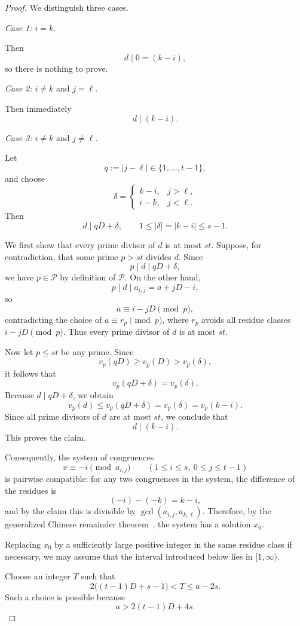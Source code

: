 \documentclass[11pt,letterpaper,reqno]{amsart}
\theoremstyle{definition}
\numberwithin{equation}{section}
\begin{document}
\begin{proof}
We distinguish three cases.

\medskip

\noindent
\emph{Case 1:} $i=k$.

Then
\[
d\mid 0=(k-i),
\]
so there is nothing to prove.

\medskip

\noindent
\emph{Case 2:} $i\ne k$ and $j=\ell$.

Then immediately
\[
d\mid (k-i).
\]

\medskip

\noindent
\emph{Case 3:} $i\ne k$ and $j\ne \ell$.

Let
\[
q:=|j-\ell|\in\{1,\dots,t-1\},
\]
and choose
\[
\delta=
\begin{cases}
k-i,& j>\ell,\\
i-k,& j<\ell.
\end{cases}
\]
Then
\[
d\mid qD+\delta,
\qquad
1\le |\delta|=|k-i|\le s-1.
\]

We first show that every prime divisor of $d$ is at most $st$. Suppose, for contradiction, that some prime $p>st$ divides $d$. Since
\[
p\mid d\mid qD+\delta,
\]
we have $p\in\mathcal P$ by definition of $\mathcal P$. On the other hand,
\[
p\mid d\mid a_{i,j}=a+jD-i,
\]
so
\[
a\equiv i-jD \pmod p,
\]
contradicting the choice of $a\equiv r_p\pmod p$, where $r_p$ avoids all residue classes $i-jD\pmod p$. Thus every prime divisor of $d$ is at most $st$.

Now let $p\le st$ be any prime. Since
\[
v_p(qD)\ge v_p(D)>v_p(\delta),
\]
it follows that
\[
v_p(qD+\delta)=v_p(\delta).
\]
Because $d\mid qD+\delta$, we obtain
\[
v_p(d)\le v_p(qD+\delta)=v_p(\delta)=v_p(k-i).
\]
Since all prime divisors of $d$ are at most $st$, we conclude that
\[
d\mid (k-i).
\]
This proves the claim.

Consequently, the system of congruences
\[
x\equiv -i \pmod{a_{i,j}}
\qquad (1\le i\le s,\ 0\le j\le t-1)
\]
is pairwise compatible: for any two congruences in the system, the difference of the residues is
\[
(-i)-(-k)=k-i,
\]
and by the claim this is divisible by $\gcd(a_{i,j},a_{k,\ell})$. Therefore, by the generalized Chinese remainder theorem~\cite[Theorem~11.5]{Donaldson180A}, the system has a solution $x_0$.

Replacing $x_0$ by a sufficiently large positive integer in the same residue class if necessary, we may assume that the interval introduced below lies in $[1,\infty)$.

Choose an integer $T$ such that
\[
2\bigl((t-1)D+s-1\bigr)<T\le a-2s.
\]
Such a choice is possible because
\[
a>2(t-1)D+4s.
\]


\end{proof}
\end{document}
